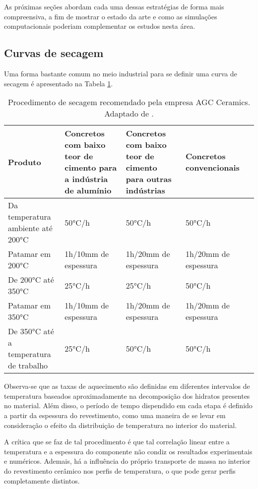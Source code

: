 As próximas seções abordam cada uma dessas estratégias de forma mais
compreensiva, a fim de mostrar o estado da arte e como as simulações
computacionais poderiam complementar os estudos nesta área.

\subsection{Curvas de secagem}
Uma forma bastante comum no meio industrial para se definir uma curva de secagem
é apresentado na Tabela \ref{tab:industrial_HUC}.

\begin{table}[ht]
\centering
\caption{Procedimento de secagem recomendado pela empresa AGC Ceramics.
  Adaptado de \cite{agc2016}.}
\label{tab:industrial_HUC}
\begin{tabularx}{\textwidth}{|X|X|X|X|X|}
\hline
Produto & Concretos com baixo teor de cimento para a indústria de alumínio & Concretos com baixo teor de cimento para outras indústrias & Concretos convencionais \\ \hline
Da temperatura ambiente até 200°C & 50°C/h & 50°C/h & 50°C/h \\ \hline
Patamar em 200°C & 1h/10mm de espessura & 1h/20mm de espessura & 1h/20mm de espessura \\ \hline
De 200°C até 350°C & 25°C/h & 25°C/h & 50°C/h \\ \hline
Patamar em 350°C & 1h/10mm de espessura & 1h/20mm de espessura & 1h/20mm de espessura \\ \hline
De 350°C até a temperatura de trabalho & 25°C/h & 50°C/h & 50°C/h \\ \hline
\end{tabularx}
\end{table}

Observa-se que as taxas de aquecimento são definidas em diferentes intervalos de
temperatura baseados aproximadamente na decomposição dos hidratos presentes no
material. Além disso, o período de tempo dispendido em cada etapa é definido a
partir da espessura do revestimento, como uma maneira de se levar em
consideração o efeito da distribuição de temperatura no interior do material.

A crítica que se faz de tal procedimento é que tal correlação linear entre a
temperatura e a espessura do componente não condiz os resultados experimentais e
numéricos. Ademais, há a influência do próprio transporte de massa no interior
do revestimento cerâmico nos perfis de temperatura, o que pode gerar perfis
completamente distintos.

